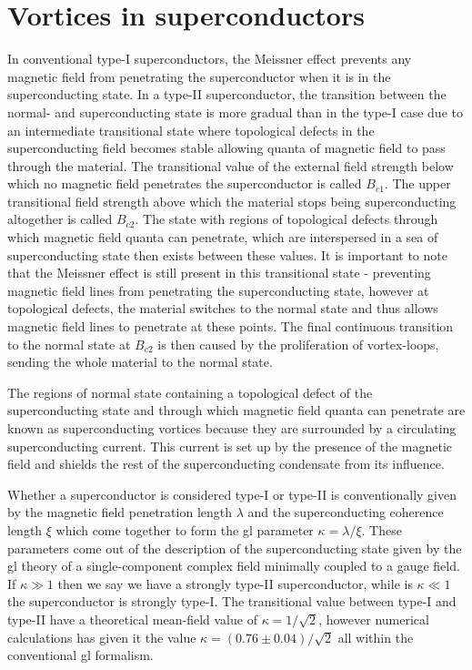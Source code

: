 \chapter{Vortices in superconductors}
\label{sec:Vor}
%
\noindent In conventional type-I superconductors, the Meissner effect prevents any magnetic field from penetrating the superconductor when it is in the
superconducting state. In a type-II superconductor, the transition between the normal- and superconducting state is more gradual than in the type-I case
due to an intermediate transitional state where topological defects in the superconducting field  becomes stable allowing quanta of magnetic field
to pass through the material. The transitional value of the external field strength below which no magnetic field penetrates the superconductor is
called $B_{c1}$. The upper transitional field strength above which the material stops being superconducting altogether is called $B_{c2}$. The state
with regions of topological defects through which magnetic field quanta can penetrate, which are interspersed in a sea of
superconducting state then exists between these values. It is important to note that the Meissner effect is still present in this transitional state - preventing magnetic field
lines from penetrating the superconducting state, however at topological defects, the material switches to the normal state and thus
allows magnetic field lines to penetrate at these points. The final continuous transition to the normal state at $B_{c2}$ is then caused by the
proliferation of vortex-loops, sending the whole material to the normal state.

The regions of normal state containing a topological defect of the superconducting state and through which magnetic field quanta can penetrate are known
as superconducting vortices because they are surrounded by a circulating superconducting current. This current is set up by the presence of the magnetic field
and shields the rest of the superconducting condensate from its influence.

Whether a superconductor is considered type-I or type-II is conventionally given by the magnetic field penetration length $\lambda$ and the superconducting
coherence length $\xi$ which come together to form the \ac{gl} parameter $\kappa = \lambda/\xi$.
These parameters come out of the description of the superconducting state given by the \ac{gl} theory of a single-component complex field minimally coupled
to a gauge field.
If $\kappa\gg1$ then we say we have a strongly
type-II superconductor, while is $\kappa\ll1$ the superconductor is strongly type-I. The transitional value between type-I and type-II have a theoretical
mean-field value of $\kappa = 1/\sqrt{2}$, however numerical calculations has given it the value $\kappa = (0.76\pm0.04)/\sqrt{2}$ all within the conventional
\ac{gl} formalism.

